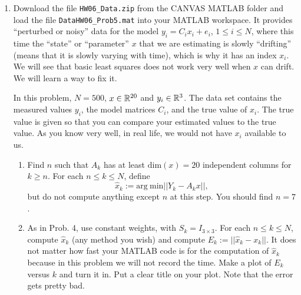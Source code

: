 \documentclass[letterpaper]{article}
\begin{document}
\begin{enumerate}
\begin{enumerate}
\end{enumerate}

\item Download the file \texttt{HW06\_Data.zip} from the CANVAS MATLAB folder and load the file \texttt{DataHW06\_Prob5.mat} into your MATLAB workspace. It provides ``perturbed or noisy'' data for the model $y_i = C_i x_i + e_i$, $1 \le i \le N$, where this time the ``state'' or ``parameter'' $x$ that we are estimating is slowly ``drifting'' (means that it is slowly varying with time), which is why it has an index $x_i$. We will see that basic least squares does not work very well when $x$ can drift. We will learn a way to fix it.

   In this problem, $N=500$, $x\in \mathbb R^{20}$ and $y_i \in \mathbb R^3$. The data set contains the measured values $y_i$, the model matrices $C_i$, and the true value of $x_i$. The true value is given so that you can compare your estimated values to the true value. As you know very well, in real life, we would not have $x_i$ available to us. \\
\begin{enumerate}
\setlength{\itemsep}{.1in}
\renewcommand{\labelenumi}{(\alph{enumi})}

\item Find $n$ such that $A_k$ has at least $\mathrm{dim}(x)=20$  independent columns for $k\ge n$. For each $n \le k \le N$, define
$$ \hat{x}_k :=\mathrm{arg~min} ||Y_k - A_k x ||, $$
but do not compute anything except $n$ at this step. You should find $n=7$.

\item As in Prob. 4,  use constant weights, with $S_k = I_{3 \times 3}.$ For each $n \le k \le N$, compute $ \hat{x}_k $ (any method you wish)
and compute $E_k :=||  \hat{x}_k  - x_k||$. It does not matter how fast your MATLAB code is for the computation of $\hat{x}_k$ because in this problem we will not record the time. Make a plot of $E_k$ versus $k$ and turn it in. Put a clear title on your plot. Note that the error gets pretty bad.


\end{enumerate}
\end{enumerate}
\end{document}
